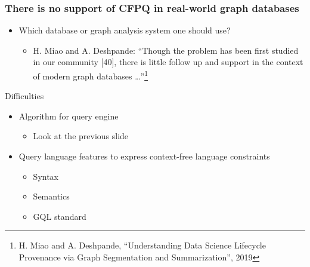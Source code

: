 \documentclass[xcolor=table,aspectratio=169]{beamer}
\begin{document}
\begin{frame}[fragile]
  \frametitle{There is no support of CFPQ in real-world graph databases}
  \begin{itemize}        
    \item[\faQuestion] Which database or graph analysis system one should use?  
    \begin{itemize}
      \item[\faFrown] H. Miao and A. Deshpande: ``Though the problem has been first studied in our community [40], there is little follow up and support in the context of modern graph databases \dots''\footnote{H. Miao and A. Deshpande,  ``Understanding Data Science Lifecycle Provenance via Graph Segmentation and Summarization'', 2019}       
    \end{itemize}
  \end{itemize}
  \vfill
  Difficulties
  \begin{itemize}        
    \item[\faQuestion] Algorithm for query engine
    \begin{itemize}
      \item[\faExclamation] Look at the previous slide       
    \end{itemize}
    \item[\faQuestion] Query language features to express context-free language constraints
    \begin{itemize}
      \item[\faQuestion] Syntax
      \item[\faQuestion] Semantics 
      \pause 
      \item[\faGears] GQL standard  
    \end{itemize}
  \end{itemize}  
\end{frame}
\end{document}
